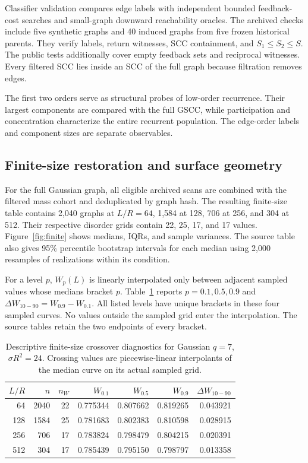 \documentclass[11pt]{article}
\begin{document}
Classifier validation compares edge labels with independent bounded feedback-cost searches and small-graph downward reachability oracles. The archived checks include five synthetic graphs and 40 induced graphs from five frozen historical parents. They verify labels, return witnesses, SCC containment, and $S_1\leq S_2\leq S$. The public tests additionally cover empty feedback sets and reciprocal witnesses. Every filtered SCC lies inside an SCC of the full graph because filtration removes edges.

The first two orders serve as structural probes of low-order recurrence. Their largest components are compared with the full GSCC, while participation and concentration characterize the entire recurrent population. The edge-order labels and component sizes are separate observables.

\subsection{Finite-size restoration and surface geometry}
For the full Gaussian graph, all eligible archived scans are combined with the filtered mass cohort and deduplicated by graph hash. The resulting finite-size table contains 2,040 graphs at $L/R=64$, 1,584 at 128, 706 at 256, and 304 at 512. Their respective disorder grids contain 22, 25, 17, and 17 values. Figure~\ref{fig:finite} shows medians, IQRs, and sample variances. The source table also gives 95\% percentile bootstrap intervals for each median using 2,000 resamples of realizations within its condition.

For a level $p$, $W_p(L)$ is linearly interpolated only between adjacent sampled values whose medians bracket $p$. Table~\ref{tab:finite} reports $p=0.1,0.5,0.9$ and $\Delta W_{10-90}=W_{0.9}-W_{0.1}$. All listed levels have unique brackets in these four sampled curves. No values outside the sampled grid enter the interpolation. The source tables retain the two endpoints of every bracket.

\begin{table}[htbp]
\centering\small
\caption{Descriptive finite-size crossover diagnostics for Gaussian $q=7$, $\sigma R^2=24$. Crossing values are piecewise-linear interpolants of the median curve on its actual sampled grid.}\label{tab:finite}
\begin{tabular}{rrrrrrr}
\toprule
$L/R$ & $n$ & $n_W$ & $W_{0.1}$ & $W_{0.5}$ & $W_{0.9}$ & $\Delta W_{10-90}$ \\
\midrule
64 & 2040 & 22 & 0.775344 & 0.807662 & 0.819265 & 0.043921 \\
128 & 1584 & 25 & 0.781683 & 0.802383 & 0.810598 & 0.028915 \\
256 & 706 & 17 & 0.783824 & 0.798479 & 0.804215 & 0.020391 \\
512 & 304 & 17 & 0.785439 & 0.795150 & 0.798797 & 0.013358 \\
\bottomrule
\end{tabular}
\end{table}
\end{document}
